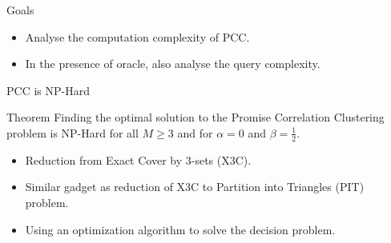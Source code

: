 \documentclass{beamer}
\begin{document}
\begin{frame}{Goals}

	\begin{itemize}
		\item Analyse the computation complexity of PCC.
		\vspace{30pt}\item In the presence of oracle, also analyse the query complexity.
	\end{itemize}	 
\end{frame}

\begin{frame}{PCC is NP-Hard}
	\begin{block}{Theorem}
		Finding the optimal solution to the Promise Correlation Clustering problem is NP-Hard for all $M \ge 3$ and for $\alpha = 0$ and $\beta = \frac{1}{2}$.  
	\end{block}
	
	\vspace{20pt}
	\begin{itemize}
		\item Reduction from Exact Cover by $3$-sets (X3C).\\
		\vspace{10pt}\item Similar gadget as reduction of X3C to Partition into Triangles (PIT) problem.
		\vspace{10pt}\item Using an optimization algorithm to solve the decision problem.  

	\end{itemize}
\end{frame}
\end{document}
